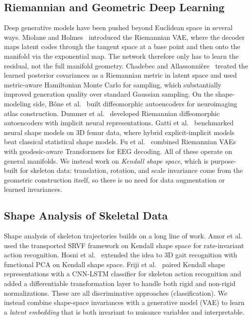 \documentclass{article}
\begin{document}
\subsection{Riemannian and Geometric Deep Learning}
Deep generative models have been pushed beyond Euclidean space in several ways. Miolane and Holmes~\cite{miolane2020learning} introduced the Riemannian VAE, where the decoder maps latent codes through the tangent space at a base point and then onto the manifold via the exponential map. The network therefore only has to learn the residual, not the full manifold geometry. Chadebec and Allassonni\`{e}re~\cite{chadebec2022geometric} treated the learned posterior covariances as a Riemannian metric in latent space and used metric-aware Hamiltonian Monte Carlo for sampling, which substantially improved generation quality over standard Gaussian sampling. On the shape-modeling side, B\^{o}ne et al.~\cite{bone2019learning} built diffeomorphic autoencoders for neuroimaging atlas construction. Dummer et al.~\cite{dummer2024rda, dummer2023rsa} developed Riemannian diffeomorphic autoencoders with implicit neural representations. Gatti et al.~\cite{gatti2024shapemed} benchmarked neural shape models on 3D femur data, where hybrid explicit-implicit models beat classical statistical shape models. Fu et al.~\cite{fu2025manifoldformer} combined Riemannian VAEs with geodesic-aware Transformers for EEG decoding. All of these operate on general manifolds. We instead work on \emph{Kendall shape space}, which is purpose-built for skeleton data: translation, rotation, and scale invariance come from the geometric construction itself, so there is no need for data augmentation or learned invariances.

\subsection{Shape Analysis of Skeletal Data}
Shape analysis of skeleton trajectories builds on a long line of work. Amor et al.~\cite{amor2015action} used the transported SRVF framework on Kendall shape space for rate-invariant action recognition. Hosni et al.~\cite{hosni20183d} extended the idea to 3D gait recognition with functional PCA on Kendall shape space. Friji et al.~\cite{friji2021geometric} paired Kendall shape representations with a CNN-LSTM classifier for skeleton action recognition and added a differentiable transformation layer to handle both rigid and non-rigid normalizations. These are all discriminative approaches (classification). We instead combine shape-space invariances with a generative model (VAE) to learn a \emph{latent embedding} that is both invariant to nuisance variables and interpretable.
\end{document}
